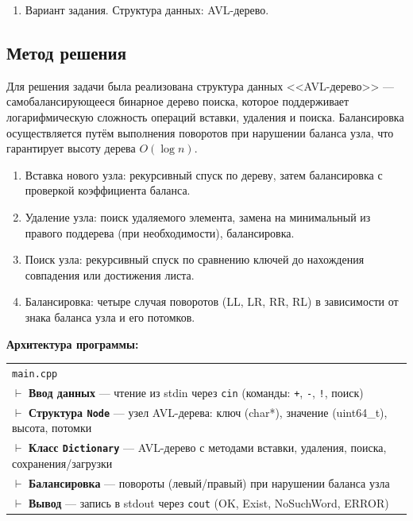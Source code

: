 \documentclass[12pt]{article}
\begin{document}
\begin{enumerate}
Для всех операций, в случае возникновения системной ошибки (нехватка памяти, отсутсвие прав записи и т.п.), программа должна вывести строку, начинающуюся с «ERROR:» и описывающую на английском языке возникшую ошибку.

\item Вариант задания.
Структура данных: AVL-дерево.
\end{enumerate}

\subsection*{Метод решения}

Для решения задачи была реализована структура данных <<AVL-дерево>> — самобалансирующееся бинарное дерево поиска, которое поддерживает логарифмическую сложность операций вставки, удаления и поиска.
Балансировка осуществляется путём выполнения поворотов при нарушении баланса узла, что гарантирует высоту дерева $O(\log n)$.

\begin{enumerate}
\item Вставка нового узла: рекурсивный спуск по дереву, затем балансировка с проверкой коэффициента баланса.
\item Удаление узла: поиск удаляемого элемента, замена на минимальный из правого поддерева (при необходимости), балансировка.
\item Поиск узла: рекурсивный спуск по сравнению ключей до нахождения совпадения или достижения листа.
\item Балансировка: четыре случая поворотов (LL, LR, RR, RL) в зависимости от знака баланса узла и его потомков.
\end{enumerate}

\textbf{Архитектура программы:}

\begin{center}
\begin{tabular}{@{}l@{}}
\texttt{main.cpp} \\
\quad $\vdash$ \textbf{Ввод данных} --- чтение из stdin через \texttt{cin} (команды: \texttt{+}, \texttt{-}, \texttt{!}, поиск) \\
\quad $\vdash$ \textbf{Структура \texttt{Node}} --- узел AVL-дерева: ключ (char*), значение (uint64\_t), высота, потомки \\
\quad $\vdash$ \textbf{Класс \texttt{Dictionary}} --- AVL-дерево с методами вставки, удаления, поиска, сохранения/загрузки \\
\quad $\vdash$ \textbf{Балансировка} --- повороты (левый/правый) при нарушении баланса узла \\
\quad $\vdash$ \textbf{Вывод} --- запись в stdout через \texttt{cout} (OK, Exist, NoSuchWord, ERROR) \\
\end{tabular}
\end{center}
\end{document}
